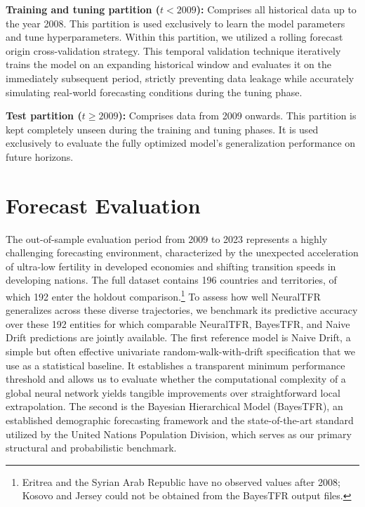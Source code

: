 \documentclass[12pt]{article}
\begin{document}
\noindent\textbf{Training and tuning partition ($t < 2009$):} Comprises all historical data up to the year 2008. This partition is used exclusively to learn the model parameters and tune hyperparameters. Within this partition, we utilized a rolling forecast origin cross-validation strategy. This temporal validation technique iteratively trains the model on an expanding historical window and evaluates it on the immediately subsequent period, strictly preventing data leakage while accurately simulating real-world forecasting conditions during the tuning phase.

\noindent\textbf{Test partition ($t \ge 2009$):} Comprises data from 2009 onwards. This partition is kept completely unseen during the training and tuning phases. It is used exclusively to evaluate the fully optimized model's generalization performance on future horizons.

\section{Forecast Evaluation}

The out-of-sample evaluation period from 2009 to 2023 represents a highly challenging forecasting environment, characterized by the unexpected acceleration of ultra-low fertility in developed economies and shifting transition speeds in developing nations. The full dataset contains 196 countries and territories, of which 192 enter the holdout comparison.\footnote{Eritrea and the Syrian Arab Republic have no observed values after 2008; Kosovo and Jersey could not be obtained from the BayesTFR output files.} To assess how well NeuralTFR generalizes across these diverse trajectories, we benchmark its predictive accuracy over these 192 entities for which comparable NeuralTFR, BayesTFR, and Naive Drift predictions are jointly available. The first reference model is Naive Drift, a simple but often effective univariate random-walk-with-drift specification that we use as a statistical baseline. It establishes a transparent minimum performance threshold and allows us to evaluate whether the computational complexity of a global neural network yields tangible improvements over straightforward local extrapolation. The second is the Bayesian Hierarchical Model (BayesTFR), an established demographic forecasting framework and the state-of-the-art standard utilized by the United Nations Population Division, which serves as our primary structural and probabilistic benchmark.
\end{document}
